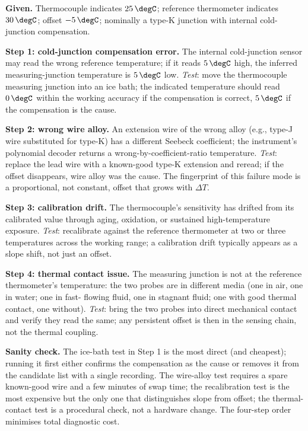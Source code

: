 \textbf{Given.} Thermocouple indicates $25 \,\degC$; reference
thermometer indicates $30 \,\degC$; offset $-5 \,\degC$;
nominally a type-K junction with internal cold-junction
compensation.

\textbf{Step 1: cold-junction compensation error.} The internal
cold-junction sensor may read the wrong reference temperature; if
it reads $5 \,\degC$ high, the inferred measuring-junction
temperature is $5 \,\degC$ low.
\emph{Test}: move the thermocouple measuring junction into an ice
bath; the indicated temperature should read $0 \,\degC$ within
the working accuracy if the compensation is correct, $5 \,\degC$
if the compensation is the cause.

\textbf{Step 2: wrong wire alloy.} An extension wire of the wrong
alloy (e.g., type-J wire substituted for type-K) has a different
Seebeck coefficient; the instrument's polynomial decoder returns
a wrong-by-coefficient-ratio temperature.
\emph{Test}: replace the lead wire with a known-good type-K
extension and reread; if the offset disappears, wire alloy was
the cause. The fingerprint of this failure mode is a
proportional, not constant, offset that grows with $\Delta T$.

\textbf{Step 3: calibration drift.} The thermocouple's
sensitivity has drifted from its calibrated value through aging,
oxidation, or sustained high-temperature exposure.
\emph{Test}: recalibrate against the reference thermometer at
two or three temperatures across the working range; a
calibration drift typically appears as a slope shift, not just
an offset.

\textbf{Step 4: thermal contact issue.} The measuring junction is
not at the reference thermometer's temperature: the two probes
are in different media (one in air, one in water; one in fast-
flowing fluid, one in stagnant fluid; one with good thermal
contact, one without).
\emph{Test}: bring the two probes into direct mechanical contact
and verify they read the same; any persistent offset is then in
the sensing chain, not the thermal coupling.

\textbf{Sanity check.} The ice-bath test in Step 1 is the most
direct (and cheapest); running it first either confirms the
compensation as the cause or removes it from the candidate list
with a single recording. The wire-alloy test requires a spare
known-good wire and a few minutes of swap time; the recalibration
test is the most expensive but the only one that distinguishes
slope from offset; the thermal-contact test is a procedural
check, not a hardware change. The four-step order minimises
total diagnostic cost.

